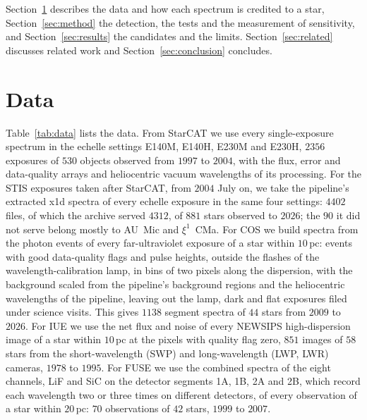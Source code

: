 \documentclass[3p,11pt]{elsarticle}
\begin{document}
Section~\ref{sec:data} describes the data and how each spectrum is credited to a star,
Section~\ref{sec:method} the detection, the tests and the measurement of sensitivity,
and Section~\ref{sec:results} the candidates and the limits. Section~\ref{sec:related}
discusses related work and Section~\ref{sec:conclusion} concludes.

\section{Data}\label{sec:data}

Table~\ref{tab:data} lists the data. From StarCAT we use every single-exposure spectrum
in the echelle settings E140M, E140H, E230M and E230H, $2356$ exposures of $530$ objects
observed from $1997$ to $2004$, with the flux, error and data-quality arrays and
heliocentric vacuum wavelengths of its processing. For the STIS exposures taken after
StarCAT, from $2004$ July on, we take the pipeline's extracted x1d spectra of every
echelle exposure in the same four settings: $4402$ files, of which the archive served
$4312$, of $881$ stars observed to $2026$; the $90$ it did not serve belong mostly to
AU~Mic and $\xi^1$~CMa. For COS we build spectra from the
photon events of every far-ultraviolet exposure of a star within $10$\,pc: events with
good data-quality flags and pulse heights, outside the flashes of the
wavelength-calibration lamp, in bins of two pixels along the dispersion, with the
background scaled from the pipeline's background regions and the heliocentric
wavelengths of the pipeline, leaving out the lamp, dark and flat exposures filed under
science visits. This gives $1138$ segment spectra of $44$ stars from $2009$ to $2026$.
For IUE we use the net flux and noise of every NEWSIPS high-dispersion image of a star
within $10$\,pc at the pixels with quality flag zero, $851$ images of $58$ stars from
the short-wavelength (SWP) and long-wavelength (LWP, LWR) cameras, $1978$ to $1995$. For
FUSE we use the combined spectra of the eight channels, LiF and SiC on the detector
segments 1A, 1B, 2A and 2B, which record each wavelength two or three times on different
detectors, of every observation of a star within $20$\,pc: $70$ observations of $42$
stars, $1999$ to $2007$.
\end{document}
